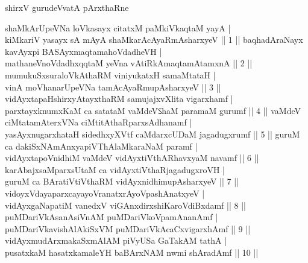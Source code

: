 \thispagestyle{empty}
\centerline{\large shirxV gurudeVvatA pArxthaRne}
\vfill\noindent
\noindent
shaMkArUpeVNa loVkasayx citatxM paMkiVkaqtaM yayA |\\
kiMkariV yasayx sA mAyA shaMkarAcAyaRmAsharxyeV \hfill|| 1 ||
\vfill\noindent
baqhadAraNayx kavAyxpi BASAyxmaqtamahoVdadheVH |\\
mathaneVnoVdadhxqqtaM yeVna vAtiRkAmaqtamAtamxnA \hfill|| 2 ||
\vfill\noindent
mumukuSxsuraloVkAthaRM viniyukatxH samaMtataH |\\
vinA moVhanarUpeVNa tamAcAyaRmupAsharxyeV \hfill|| 3 ||
\vfill\noindent
vidAyxtapaHshirxyAtayxthaRM samujajxvXlita vigarxhamf |\\
parxtayxknumxKaM ca satataM vaMdeVऽhaM paramaM gurumf \hfill|| 4 ||
\vfill\noindent
vaMdeV ciMtatamAterxVNa ciMtitAthaRparxsAdhanamf |\\
yasAyxnugarxhataH sidedhxyXVtf caMdarxcUDaM jagadugxrumf \hfill|| 5 ||
\vfill\noindent
guruM ca dakiSxNAmAnxyapiVThAlaMkaraNaM paramf |\\
vidAyxtapoVnidhiM vaMdeV vidAyxtiVthARhavxyaM navamf \hfill|| 6 ||
\vfill\noindent
karAbajxsaMparxsUtaM ca vidAyxtiVthaRjagadugxroVH |\\
guruM ca BAratiVtiVthaRM vidAyxnidhimupAsharxyeV \hfill|| 7 ||
\vfill\noindent
vidoyxVdayaparxcayayoVranatxrAyoVpashAnatxyeV |\\
vidAyxgaNapatiM vanedxV viGAnxdirxshiKaroVdiBxdamf \hfill|| 8 ||
\vfill\noindent
puMDariVkAsanAsiVnAM puMDariVkoVpamAnanAmf |\\
puMDariVkavishAlAkiSxVM puMDariVkAcaCxvigarxhAmf \hfill|| 9 ||
\vfill\noindent
vidAyxmudArxmakaSxmAlAM piVyUSa GaTakAM tathA |\\
pusatxkaM hasatxkamaleYH baBArxNAM nwmi shAradAmf \hfill|| 10 ||
